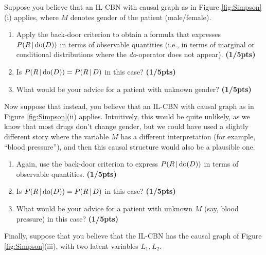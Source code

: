 \begin{enumerate}
Suppose you believe that an IL-CBN with causal graph as in Figure \ref{fig:Simpson}(i) applies, where $M$ denotes gender of the patient (male/female).

\begin{enumerate}[label=\alph*)]
\item \label{Simpson_1} Apply the back-door criterion to obtain a formula that expresses $P(R \operatorname*{|} \text{do}(D))$ in terms of observable quantities (i.e., in terms of marginal or conditional distributions where the \emph{do}-operator does not appear).  \textbf{(1/5pts)}



\item Is $P(R \operatorname*{|} \text{do}(D)) = P(R \operatorname*{|} D)$ in this case?  \textbf{(1/5pts)}


\item What would be your advice for a patient with unknown gender?  \textbf{(1/5pts)}

\end{enumerate}

Now suppose that instead, you believe that an IL-CBN with causal graph as in Figure \ref{fig:Simpson}(ii) applies. Intuitively, this would be quite unlikely, as we
know that most drugs don't change gender, but we could have used a slightly different story where the variable $M$ has a different interpretation
(for example, ``blood pressure''), and then this causal structure would also be a plausible one.

\begin{enumerate}[resume*]
  \item Again, use the back-door criterion to express $P(R \operatorname*{|} \text{do}(D))$ in terms of observable quantities.  \textbf{(1/5pts)}


  \item Is $P(R \operatorname*{|} \text{do}(D)) = P(R \operatorname*{|} D)$ in this case?  \textbf{(1/5pts)}


\item \label{Simpson_2} What would be your advice for a patient with unknown $M$ (say, blood pressure) in this case?  \textbf{(1/5pts)}

\end{enumerate}

Finally, suppose that you believe that the IL-CBN has the causal graph of Figure \ref{fig:Simpson}(iii), with two
latent variables $L_1,L_2$.


\end{enumerate}

